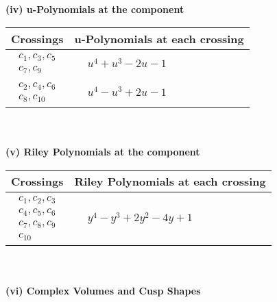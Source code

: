 \documentclass[1p]{elsarticle_modified}
\theoremstyle{definition}
\begin{document}
\newpage\renewcommand{\arraystretch}{1}
\flushleft \textbf{(iv) u-Polynomials at the component}\newline \\
\begin{tabular}{m{50pt}|m{274pt}}
Crossings & \hspace{64pt}u-Polynomials at each crossing \\
\hline $$\begin{aligned}c_{1},c_{3},c_{5}\\c_{7},c_{9}\end{aligned}$$&$\begin{aligned}
&u^4+u^3-2 u-1
\end{aligned}$\\
\hline $$\begin{aligned}c_{2},c_{4},c_{6}\\c_{8},c_{10}\end{aligned}$$&$\begin{aligned}
&u^4- u^3+2 u-1
\end{aligned}$\\
\hline
\end{tabular}\\~\\
\newpage\renewcommand{\arraystretch}{1}
\flushleft \textbf{(v) Riley Polynomials at the component}\newline \\
\begin{tabular}{m{50pt}|m{274pt}}
Crossings & \hspace{64pt}Riley Polynomials at each crossing \\
\hline $$\begin{aligned}c_{1},c_{2},c_{3}\\c_{4},c_{5},c_{6}\\c_{7},c_{8},c_{9}\\c_{10}\end{aligned}$$&$\begin{aligned}
&y^4- y^3+2 y^2-4 y+1
\end{aligned}$\\
\hline
\end{tabular}\\~\\
\newpage\flushleft \textbf{(vi) Complex Volumes and Cusp Shapes}
\end{document}
